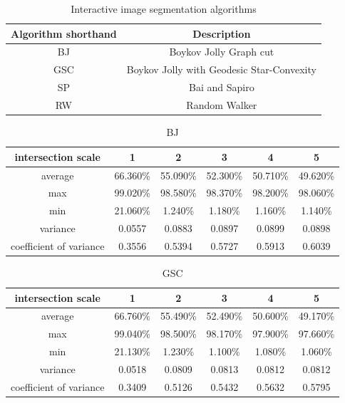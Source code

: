 \documentclass[runningheads,a4paper]{llncs}
\begin{document}
\begin{table}
\centering
\begin{tabular}{|c|c|}
\hline
Algorithm shorthand & Description\\
\hline
BJ\citep{boykov2001interactive} &  Boykov Jolly Graph cut  \\
\hline
GSC\citep{gulshan2010geodesic}& Boykov Jolly with Geodesic Star-Convexity \\
\hline
SP\citep{bai2007geodesic} & Bai and Sapiro \\
\hline
RW\citep {grady2006random}& Random Walker  \\
\hline
\end{tabular}
\caption{Interactive image segmentation algorithms}
\label{ta:algorithms}
\end{table}



\begin{table}
\centering
\begin{tabular}{|c|c|c|c|c|c|}
\hline
 intersection scale & 1 & 2 & 3 & 4& 5 \\
\hline
average& 66.360\% & 55.090\% & 52.300\% & 50.710\%& 49.620\% \\
\hline
max& 99.020\% & 98.580\% & 98.370\% & 98.200\%& 98.060\% \\
\hline
min& 21.060\% & 1.240\% & 1.180\% & 1.160\%& 1.140\%\\
\hline
variance& 0.0557 & 0.0883 & 0.0897 & 0.0899& 0.0898 \\
\hline
coefficient of variance& 0.3556 & 0.5394 & 0.5727 & 0.5913& 0.6039\\
\hline
\end{tabular}
\caption{BJ}
\label{ta:bj intersection}
\end{table}

\begin{table}
\centering
\begin{tabular}{|c|c|c|c|c|c|}
\hline
intersection scale & 1 & 2 & 3 & 4& 5 \\
\hline
average& 66.760\% & 55.490\% & 52.490\% & 50.600\%& 49.170\% \\
\hline
max& 99.040\% & 98.500\% & 98.170\% & 97.900\%& 97.660\% \\
\hline
min& 21.130\% & 1.230\% & 1.100\% & 1.080\%& 1.060\%\\
\hline
variance& 0.0518 & 0.0809 & 0.0813 & 0.0812& 0.0812 \\
\hline
coefficient of variance& 0.3409 & 0.5126 & 0.5432 & 0.5632& 0.5795\\
\hline
\end{tabular}
\caption{GSC}
\label{ta:gsc intersection}
\end{table}
\end{document}
